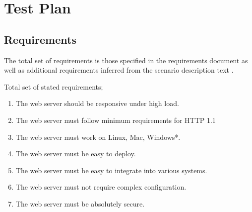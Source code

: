 %
%
%


\section{Test Plan}
%
%


%
%

\subsection{Requirements}
The total set of requirements is those specified in the requirements document
\cite{2dv610:assignment2-requirements} as well as additional requirements
inferred from the scenario description text
\cite{2dv610:assignment2-instructions}.

Total set of stated requirements;
\begin{enumerate}
  \item The web server should be responsive under high load.
  \item The web server must follow minimum requirements for HTTP 1.1
  \item The web server must work on Linux, Mac, Windows*.
  \item The web server must be easy to deploy.
  \item The web server must be easy to integrate into various systems.
  \item The web server must not require complex configuration.
  \item The web server must be absolutely secure.
\end{enumerate}


